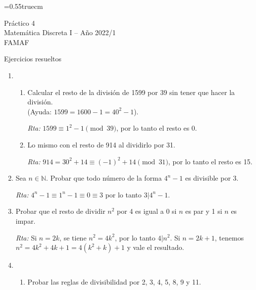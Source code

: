 \documentclass[a4paper,12pt,twoside,spanish,reqno]{amsbook}
\numberwithin{equation}{section}
\newcommand{\rta}{\noindent\textit{Rta: }}
\newcommand \N{{\mathbb N}}
\begin{document}
    \baselineskip=0.55truecm %

{\bf \begin{center} Práctico 4 \\ Matemática Discreta I -- Año 2022/1 \\ FAMAF \end{center}}

{\bf \begin{center} Ejercicios resueltos \end{center}}

\begin{enumerate}
\setlength\itemsep{1.1em}

    \item  
    \begin{enumerate}
        \item Calcular el resto de la división de 1599 por 39 sin tener que hacer la división. \\(Ayuda: $1599=1600-1=40^2-1$).
        
        \rta $1599\equiv 1^2-1\pmod{ 39}$, por lo tanto el resto es 0.
        
        \item Lo mismo con el resto de 914 al dividirlo por 31.
        
        \rta $914=30^2+14\equiv (-1)^2+14 \pmod{ 31}$, por lo tanto el resto es 15.
    \end{enumerate}
    
    
    
    \item Sea $n\in\N$. Probar que todo número de la forma $4^n-1$ es divisible por 3.
    
    \rta $4^n-1\equiv 1^n-1 \equiv 0 \equiv 3$ por lo tanto $3\vert 4^n-1$.
    
    
    \item Probar que el resto de dividir $n^2$ por 4 es igual a 0 si $n$ es par y 1 si $n$ es impar.
        
    \rta  Si $n=2k$, se tiene $n^2=4k^2$, por lo tanto $4\vert n^2$. Si $n=2k+1$, tenemos $n^2=4k^2+4k+1=4(k^2+k)+1$ y vale el resultado.
    
    
    
    
    \item
    \begin{enumerate}
        \item
        Probar las reglas de divisibilidad por 2, 3, 4, 5, 8, 9 y 11.%
            

\end{enumerate}
\end{enumerate}
\end{document}
